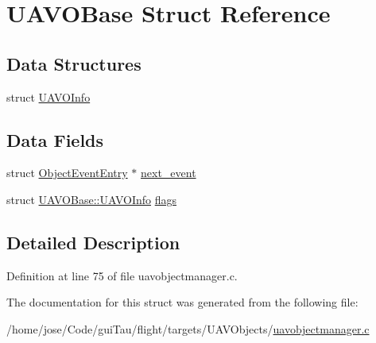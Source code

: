 \hypertarget{struct_u_a_v_o_base}{\section{U\-A\-V\-O\-Base Struct Reference}
\label{struct_u_a_v_o_base}
}
\subsection*{Data Structures}
\begin{DoxyCompactItemize}
\item 
struct \hyperlink{struct_u_a_v_o_base_1_1_u_a_v_o_info}{U\-A\-V\-O\-Info}
\end{DoxyCompactItemize}
\subsection*{Data Fields}
\begin{DoxyCompactItemize}
\item 
struct \hyperlink{struct_object_event_entry}{Object\-Event\-Entry} $\ast$ \hyperlink{group___u_a_v_gaa0d6ea1fcd5ae56953e8dd7f244dd988}{next\-\_\-event}
\item 
struct \hyperlink{struct_u_a_v_o_base_1_1_u_a_v_o_info}{U\-A\-V\-O\-Base\-::\-U\-A\-V\-O\-Info} \hyperlink{group___u_a_v_ga613d564f9ee891c00dba4e3fe6277193}{flags}
\end{DoxyCompactItemize}


\subsection{Detailed Description}


Definition at line 75 of file uavobjectmanager.\-c.



The documentation for this struct was generated from the following file\-:\begin{DoxyCompactItemize}
\item 
/home/jose/\-Code/gui\-Tau/flight/targets/\-U\-A\-V\-Objects/\hyperlink{uavobjectmanager_8c}{uavobjectmanager.\-c}\end{DoxyCompactItemize}
